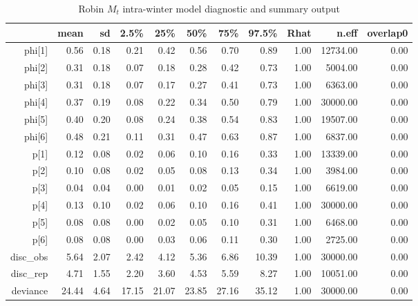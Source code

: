 \begin{table}[ht]
\centering
\begin{tabular}{rrrrrrrrrrr}
  \hline
 & mean & sd & 2.5\% & 25\% & 50\% & 75\% & 97.5\% & Rhat & n.eff & overlap0 \\ 
  \hline
phi[1] & 0.56 & 0.18 & 0.21 & 0.42 & 0.56 & 0.70 & 0.89 & 1.00 & 12734.00 & 0.00 \\ 
  phi[2] & 0.31 & 0.18 & 0.07 & 0.18 & 0.28 & 0.42 & 0.73 & 1.00 & 5004.00 & 0.00 \\ 
  phi[3] & 0.31 & 0.18 & 0.07 & 0.17 & 0.27 & 0.41 & 0.73 & 1.00 & 6363.00 & 0.00 \\ 
  phi[4] & 0.37 & 0.19 & 0.08 & 0.22 & 0.34 & 0.50 & 0.79 & 1.00 & 30000.00 & 0.00 \\ 
  phi[5] & 0.40 & 0.20 & 0.08 & 0.24 & 0.38 & 0.54 & 0.83 & 1.00 & 19507.00 & 0.00 \\ 
  phi[6] & 0.48 & 0.21 & 0.11 & 0.31 & 0.47 & 0.63 & 0.87 & 1.00 & 6837.00 & 0.00 \\ 
  p[1] & 0.12 & 0.08 & 0.02 & 0.06 & 0.10 & 0.16 & 0.33 & 1.00 & 13339.00 & 0.00 \\ 
  p[2] & 0.10 & 0.08 & 0.02 & 0.05 & 0.08 & 0.13 & 0.34 & 1.00 & 3984.00 & 0.00 \\ 
  p[3] & 0.04 & 0.04 & 0.00 & 0.01 & 0.02 & 0.05 & 0.15 & 1.00 & 6619.00 & 0.00 \\ 
  p[4] & 0.13 & 0.10 & 0.02 & 0.06 & 0.10 & 0.16 & 0.41 & 1.00 & 30000.00 & 0.00 \\ 
  p[5] & 0.08 & 0.08 & 0.00 & 0.02 & 0.05 & 0.10 & 0.31 & 1.00 & 6468.00 & 0.00 \\ 
  p[6] & 0.08 & 0.08 & 0.00 & 0.03 & 0.06 & 0.11 & 0.30 & 1.00 & 2725.00 & 0.00 \\ 
  disc\_obs & 5.64 & 2.07 & 2.42 & 4.12 & 5.36 & 6.86 & 10.39 & 1.00 & 30000.00 & 0.00 \\ 
  disc\_rep & 4.71 & 1.55 & 2.20 & 3.60 & 4.53 & 5.59 & 8.27 & 1.00 & 10051.00 & 0.00 \\ 
  deviance & 24.44 & 4.64 & 17.15 & 21.07 & 23.85 & 27.16 & 35.12 & 1.00 & 30000.00 & 0.00 \\ 
   \hline
\end{tabular}
\caption{Robin $M_t$ intra-winter model diagnostic and summary output} 
\label{tab:robin_m0_intra}
\end{table}
